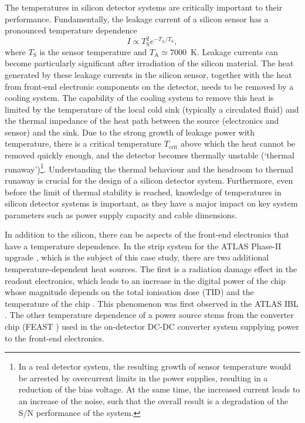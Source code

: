 The temperatures in silicon detector systems are critically important to their performance. Fundamentally, the leakage current of a silicon sensor has a pronounced temperature dependence 
\begin{equation}
I\propto T_\text{S}^2e^{-T_\text{A}/T_\text{S}},
\label{eq:leakage_current_temp_dependence}
\end{equation}
where $T_\text{S}$ is the sensor temperature and $T_\text{A}\simeq7000$~K. Leakage currents can become particularly significant after irradiation of the silicon material. The heat generated by these leakage currents in the silicon sensor, together with the heat from front-end electronic components on the detector, needs to be removed by a cooling system. The capability of the cooling system to remove this heat is limited by the temperature of the local cold sink (typically a circulated fluid) and the thermal impedance of the heat path between the source (electronics and sensor) and the sink. Due to the strong growth of leakage power with temperature, there is a critical temperature $T_\text{crit}$ above which the heat cannot be removed quickly enough, and the detector becomes thermally unstable (`thermal runaway')\footnote{In a real detector system, the resulting growth of sensor temperature would be arrested by overcurrent limits in the power supplies, resulting in a reduction of the bias voltage. At the same time, the increased current leads to an increase of the noise, such that the overall result is a degradation of the S/N performance of the system.}. Understanding the thermal behaviour and the headroom to thermal runaway is crucial for the design of a silicon detector system. Furthermore, even before the limit of thermal stability is reached, knowledge of temperatures in silicon detector systems is important, as they have a major impact on key system parameters such as power supply capacity and cable dimensions.

In addition to the silicon,
there can be aspects of the front-end electronics that have a temperature dependence. In the strip system for the ATLAS Phase-II upgrade \cite{Collaboration:2017mtb}, which is the subject of this case study, there are two additional temperature-dependent heat sources. The first is a radiation damage effect in the readout electronics, which leads to an increase in the digital power of the chip whose magnitude depends on the total ionisation dose (TID) and the temperature of the chip \cite{Collaboration:2017mtb}. This phenomenon was first observed in the ATLAS IBL \cite{ATL-INDET-PUB-2017-001}. The other temperature dependence of a power source stems from the converter chip (FEAST \cite{1748-0221-6-11-C11035}) used in the on-detector DC-DC converter system supplying power to the front-end electronics. 


